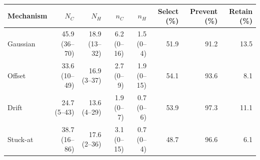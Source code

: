 \begin{tabular}{lrrrrrrr}
\toprule
Mechanism & $N_C$ & $N_H$ & $n_C$ & $n_H$ & Select (\%) & Prevent (\%) & Retain (\%) \\
\midrule
Gaussian & 45.9 (36--70) & 18.9 (13--32) & 6.2 (0--16) & 1.5 (0--4) & 51.9 & 91.2 & 13.5 \\
Offset & 33.6 (10--49) & 16.9 (3--37) & 2.7 (0--9) & 1.9 (0--15) & 54.1 & 93.6 & 8.1 \\
Drift & 24.7 (5--43) & 13.6 (4--29) & 1.9 (0--7) & 0.7 (0--6) & 53.9 & 97.3 & 11.1 \\
Stuck-at & 38.7 (16--86) & 17.6 (2--36) & 3.1 (0--15) & 0.7 (0--4) & 48.7 & 96.6 & 6.1 \\
\bottomrule
\end{tabular}
